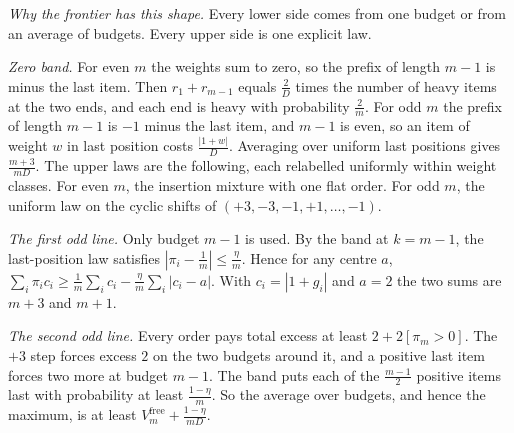 
\emph{Why the frontier has this shape.} Every lower side comes from one budget or from an
average of budgets. Every upper side is one explicit law.

\emph{Zero band.} For even $m$ the weights sum to zero, so the prefix of length $m-1$ is minus
the last item. Then $r_{1}+r_{m-1}$ equals $\frac{2}{D}$ times the number of heavy items at
the two ends, and each end is heavy with probability $\frac{2}{m}$. For odd $m$ the prefix
of length $m-1$ is $-1$ minus the last item, and $m-1$ is even, so an item of weight $w$ in
last position costs $\frac{|1+w|}{D}$. Averaging over uniform last positions gives
$\frac{m+3}{mD}$. The upper laws are the following, each relabelled uniformly within weight
classes. For even $m$, the insertion mixture with one flat order. For odd $m$, the uniform
law on the cyclic shifts of $(+3,-3,-1,+1,\dots,-1)$.

\emph{The first odd line.} Only budget $m-1$ is used. By the band at $k=m-1$, the
last-position law satisfies $|\pi_{i}-\frac1m|\le\frac{\eta}{m}$. Hence for any centre $a$,
$\sum_{i}\pi_{i}c_{i}\ge\frac1m\sum_{i}c_{i}-\frac{\eta}{m}\sum_{i}|c_{i}-a|$. With
$c_{i}=|1+g_{i}|$ and $a=2$ the two sums are $m+3$ and $m+1$.

\emph{The second odd line.} Every order pays total excess at least $2+2[\pi_{m}>0]$. The
$+3$ step forces excess $2$ on the two budgets around it, and a positive last item forces two
more at budget $m-1$. The band puts each of the $\frac{m-1}{2}$ positive items last with
probability at least $\frac{1-\eta}{m}$. So the average over budgets, and hence the maximum,
is at least $V^{\mathrm{free}}_{m}+\frac{1-\eta}{mD}$.

